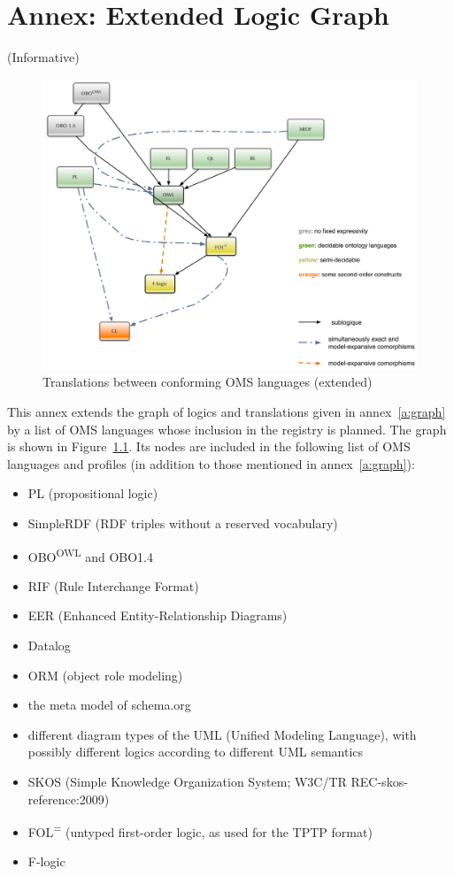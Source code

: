 \documentclass[10pt,fleqn,final]{scrreprt}
\newcommand{\cbs}[0]{\color{red}\xspace} %
\newcommand{\cbe}[0]{\color{black}\xspace} %
\newcommand{\annexrefname}{annex}
\newcommand{\figurerefname}{Figure}
\newcommand{\aref}[1]{\annexrefname~\ref{#1}}
\newcommand{\fref}[1]{\figurerefname~\ref{#1}}
\newcommand{\informative}[0]{{\begin{center}{\Large{(Informative})}\end{center}} \bigskip}
\newcommand{\nisref}[1]{#1}
\newcommand{\infannex}[1]{ \chapter{Annex: #1}  \informative }
\newenvironment{definitions}[0]{\medskip }{}
\begin{document}
\begin{definitions}
\infannex{Extended Logic Graph}\label{a:ext-graph}

\begin{figure}
  \centering
  \includegraphics[width=\textwidth]{illustrations/pre-reduced-ontograph}
  \caption{Translations between conforming OMS languages (extended)}
  \label{fig:pre-ontograph}
\end{figure}
This annex extends the graph of logics and translations given in
\aref{a:graph} by a list of OMS languages \cbs whose inclusion in
the registry is planned\cbe.  The graph is shown in
\fref{fig:pre-ontograph}.  Its nodes are included in the following
list of OMS languages and profiles (in addition to those
mentioned in \aref{a:graph}):
\begin{itemize}
\item PL (propositional logic)
\item SimpleRDF (RDF triples without a reserved vocabulary)
\item OBO\textsuperscript{OWL} and OBO1.4
\item RIF (Rule Interchange Format)
\item EER (Enhanced Entity-Relationship Diagrams) %
\item Datalog
\item ORM (object role modeling)
\item the meta model of schema.org
\item different diagram types of the UML (Unified Modeling Language), with possibly different logics according to different
UML semantics
\item SKOS (Simple Knowledge Organization System; \nisref{W3C/TR REC-skos-reference:2009})
\item FOL\textsuperscript{=} (untyped first-order logic, as used for the
TPTP format)
\item F-logic
\end{itemize}


\end{definitions}
\end{document}
